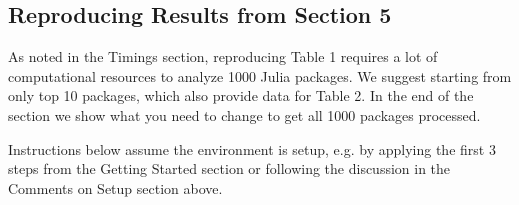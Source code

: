 \documentclass[
]{article}
\begin{document}
\hypertarget{reproducing-results-from-section-5}{%
\subsection{Reproducing Results from Section
5}\label{reproducing-results-from-section-5}}

As noted in the Timings section, reproducing Table 1 requires a lot of
computational resources to analyze 1000 Julia packages. We suggest starting
from only top 10 packages, which also provide data for Table 2. In the end of
the section we show what you need to change to get all 1000 packages processed.

Instructions below assume the environment is setup, e.g. by applying the first 3
steps from the Getting Started section or following the discussion in the
Comments on Setup section above.
\end{document}
